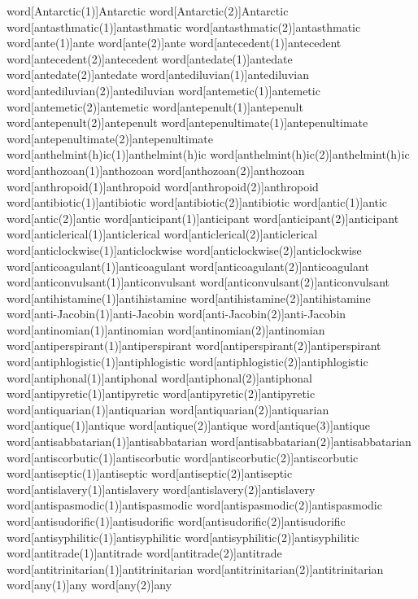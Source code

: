word[Antarctic(1)]{Antarctic}
word[Antarctic(2)]{Antarctic}
word[antasthmatic(1)]{antasthmatic}
word[antasthmatic(2)]{antasthmatic}
word[ante(1)]{ante}
word[ante(2)]{ante}
word[antecedent(1)]{antecedent}
word[antecedent(2)]{antecedent}
word[antedate(1)]{antedate}
word[antedate(2)]{antedate}
word[antediluvian(1)]{antediluvian}
word[antediluvian(2)]{antediluvian}
word[antemetic(1)]{antemetic}
word[antemetic(2)]{antemetic}
word[antepenult(1)]{antepenult}
word[antepenult(2)]{antepenult}
word[antepenultimate(1)]{antepenultimate}
word[antepenultimate(2)]{antepenultimate}
word[{anthelmint(h)ic}(1)]{anthelmint(h)ic}
word[{anthelmint(h)ic}(2)]{anthelmint(h)ic}
word[anthozoan(1)]{anthozoan}
word[anthozoan(2)]{anthozoan}
word[anthropoid(1)]{anthropoid}
word[anthropoid(2)]{anthropoid}
word[antibiotic(1)]{antibiotic}
word[antibiotic(2)]{antibiotic}
word[antic(1)]{antic}
word[antic(2)]{antic}
word[anticipant(1)]{anticipant}
word[anticipant(2)]{anticipant}
word[anticlerical(1)]{anticlerical}
word[anticlerical(2)]{anticlerical}
word[anticlockwise(1)]{anticlockwise}
word[anticlockwise(2)]{anticlockwise}
word[anticoagulant(1)]{anticoagulant}
word[anticoagulant(2)]{anticoagulant}
word[anticonvulsant(1)]{anticonvulsant}
word[anticonvulsant(2)]{anticonvulsant}
word[antihistamine(1)]{antihistamine}
word[antihistamine(2)]{antihistamine}
word[anti-Jacobin(1)]{anti-Jacobin}
word[anti-Jacobin(2)]{anti-Jacobin}
word[antinomian(1)]{antinomian}
word[antinomian(2)]{antinomian}
word[antiperspirant(1)]{antiperspirant}
word[antiperspirant(2)]{antiperspirant}
word[antiphlogistic(1)]{antiphlogistic}
word[antiphlogistic(2)]{antiphlogistic}
word[antiphonal(1)]{antiphonal}
word[antiphonal(2)]{antiphonal}
word[antipyretic(1)]{antipyretic}
word[antipyretic(2)]{antipyretic}
word[antiquarian(1)]{antiquarian}
word[antiquarian(2)]{antiquarian}
word[antique(1)]{antique}
word[antique(2)]{antique}
word[antique(3)]{antique}
word[antisabbatarian(1)]{antisabbatarian}
word[antisabbatarian(2)]{antisabbatarian}
word[antiscorbutic(1)]{antiscorbutic}
word[antiscorbutic(2)]{antiscorbutic}
word[antiseptic(1)]{antiseptic}
word[antiseptic(2)]{antiseptic}
word[antislavery(1)]{antislavery}
word[antislavery(2)]{antislavery}
word[antispasmodic(1)]{antispasmodic}
word[antispasmodic(2)]{antispasmodic}
word[antisudorific(1)]{antisudorific}
word[antisudorific(2)]{antisudorific}
word[antisyphilitic(1)]{antisyphilitic}
word[antisyphilitic(2)]{antisyphilitic}
word[antitrade(1)]{antitrade}
word[antitrade(2)]{antitrade}
word[antitrinitarian(1)]{antitrinitarian}
word[antitrinitarian(2)]{antitrinitarian}
word[any(1)]{any}
word[any(2)]{any}
